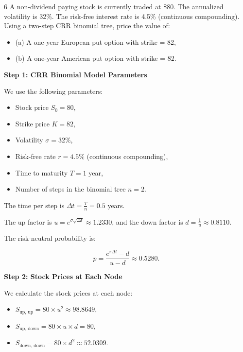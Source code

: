 \documentclass[12pt,letterpaper, onecolumn]{exam}
\begin{document}
\newpage

\begin{question} 6
A non-dividend paying stock is currently traded at \$80. The annualized volatility is 32\%. The risk-free interest rate is 4.5\% (continuous compounding). Using a two-step CRR binomial tree, price the value of:
\begin{itemize}
    \item (a) A one-year European put option with strike = 82,
    \item (b) A one-year American put option with strike = 82.
\end{itemize}
\end{question}

\begin{solution}

\textbf{Step 1: CRR Binomial Model Parameters}

We use the following parameters:
\begin{itemize}
    \item Stock price \( S_0 = 80 \),
    \item Strike price \( K = 82 \),
    \item Volatility \( \sigma = 32\% \),
    \item Risk-free rate \( r = 4.5\% \) (continuous compounding),
    \item Time to maturity \( T = 1 \) year,
    \item Number of steps in the binomial tree \( n = 2 \).
\end{itemize}

The time per step is \( \Delta t = \frac{T}{n} = 0.5 \) years.

The up factor is \( u = e^{\sigma \sqrt{\Delta t}} \approx 1.2330 \), and the down factor is \( d = \frac{1}{u} \approx 0.8110 \).

The risk-neutral probability is:

\[
p = \frac{e^{r \Delta t} - d}{u - d} \approx 0.5280.
\]

\textbf{Step 2: Stock Prices at Each Node}

We calculate the stock prices at each node:
\begin{itemize}
    \item \( S_{\text{up, up}} = 80 \times u^2 \approx 98.8649 \),
    \item \( S_{\text{up, down}} = 80 \times u \times d = 80 \),
    \item \( S_{\text{down, down}} = 80 \times d^2 \approx 52.0309 \).
\end{itemize}


\end{solution}
\end{document}
